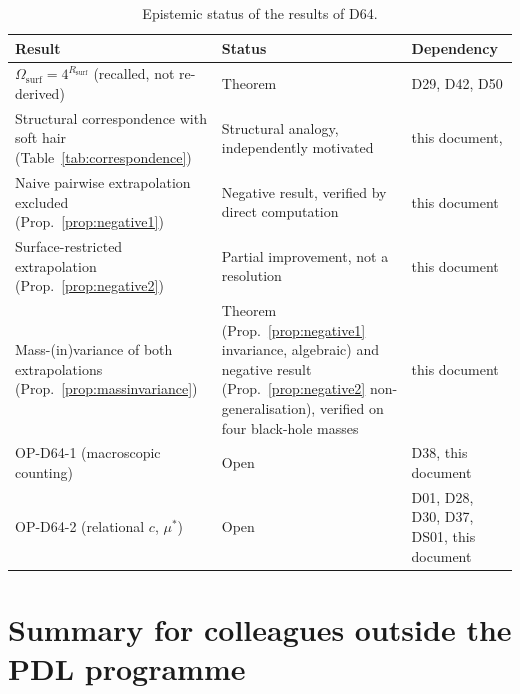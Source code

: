 \documentclass[12pt,a4paper]{article}
\newcommand{\Rsurf}{R_{\mathrm{surf}}}
\newcommand{\Omegasurf}{\Omega_{\mathrm{surf}}}
\begin{document}
\begin{table}[H]
\centering
\caption{Epistemic status of the results of D64.}
\label{tab:epistemic}
\small
\begin{tabular}{p{6.5cm}p{3cm}p{4cm}}
\toprule
Result & Status & Dependency \\
\midrule
$\Omegasurf = 4^{\Rsurf}$ (recalled, not re-derived) & Theorem & D29, D42, D50 \\[4pt]
Structural correspondence with soft hair (Table~\ref{tab:correspondence}) & Structural analogy, independently motivated & this document, \cite{HPS2016,HPS2017,N02} \\[4pt]
Naive pairwise extrapolation excluded (Prop.~\ref{prop:negative1}) & Negative result, verified by direct computation & this document \\[4pt]
Surface-restricted extrapolation (Prop.~\ref{prop:negative2}) & Partial improvement, not a resolution & this document \\[4pt]
Mass-(in)variance of both extrapolations (Prop.~\ref{prop:massinvariance}) & Theorem (Prop.~\ref{prop:negative1} invariance, algebraic) and negative result (Prop.~\ref{prop:negative2} non-generalisation), verified on four black-hole masses & this document \\[4pt]
OP-D64-1 (macroscopic counting) & Open & D38, this document \\[4pt]
OP-D64-2 (relational $c$, $\mu^*$) & Open & D01, D28, D30, D37, DS01, this document \\
\bottomrule
\end{tabular}
\end{table}

\section{Summary for colleagues outside the PDL programme}
\label{sec:summary}
\end{document}
